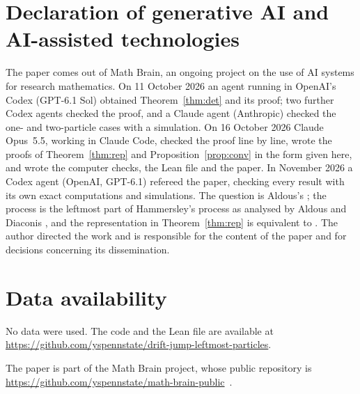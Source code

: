 \documentclass[11pt]{amsart}
\theoremstyle{remark}
\numberwithin{equation}{section}
\begin{document}
\section*{Declaration of generative AI and AI-assisted technologies}
The paper comes out of Math Brain, an ongoing project on the use of AI systems for research mathematics. On 11 October 2026 an agent running in OpenAI's Codex (GPT-6.1 Sol) obtained Theorem~\ref{thm:det} and its proof; two further Codex agents checked the proof, and a Claude agent (Anthropic) checked the one- and two-particle cases with a simulation. On 16 October 2026 Claude Opus~5.5, working in Claude Code, checked the proof line by line, wrote the proofs of Theorem~\ref{thm:rep} and Proposition~\ref{prop:conv} in the form given here, and wrote the computer checks, the Lean file and the paper. In November 2026 a Codex agent (OpenAI, GPT-6.1) refereed the paper, checking every result with its own exact computations and simulations. The question is Aldous's \cite{Ald18}; the process is the leftmost part of Hammersley's process \cite{Ham72} as analysed by Aldous and Diaconis \cite{AD93,AD99}, and the representation in Theorem~\ref{thm:rep} is equivalent to \cite[(42)]{AD93}. The author directed the work and is responsible for the content of the paper and for decisions concerning its dissemination.

\section*{Data availability}
No data were used. The code and the Lean file are available at\\ \url{https://github.com/yspennstate/drift-jump-leftmost-particles}.

The paper is part of the Math Brain project, whose public repository is \url{https://github.com/yspennstate/math-brain-public}~\cite{MathBrainRepo}.
\end{document}
